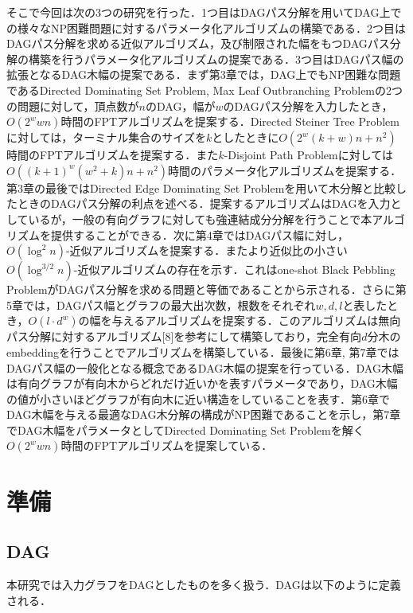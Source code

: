 \documentclass[master]{kuisthesis}		%
\theoremstyle{plain}
\theoremstyle{definition}
\begin{document}
そこで今回は次の3つの研究を行った．1つ目はDAGパス分解を用いてDAG上での様々なNP困難問題に対するパラメータ化アルゴリズムの構築である．2つ目はDAGパス分解を求める近似アルゴリズム，及び制限された幅をもつDAGパス分解の構築を行うパラメータ化アルゴリズムの提案である．3つ目はDAGパス幅の拡張となるDAG木幅の提案である．まず第3章では，DAG上でもNP困難な問題であるDirected Dominating Set Problem, Max Leaf Outbranching Problemの2つの問題に対して，頂点数が$n$のDAG，幅が$w$のDAGパス分解を入力したとき，$O(2^wwn)$時間のFPTアルゴリズムを提案する．Directed Steiner Tree Problemに対しては，ターミナル集合のサイズを$k$としたときに$O(2^w(k+w)n+n^2)$時間のFPTアルゴリズムを提案する．また$k$-Disjoint Path Problemに対しては$O((k+1)^w(w^2+k)n+n^2)$時間のパラメータ化アルゴリズムを提案する．第3章の最後ではDirected Edge Dominating Set Problemを用いて木分解と比較したときのDAGパス分解の利点を述べる．提案するアルゴリズムはDAGを入力としているが，一般の有向グラフに対しても強連結成分分解を行うことで本アルゴリズムを提供することができる．次に第4章ではDAGパス幅に対し，$O(\log^2 n)$-近似アルゴリズムを提案する．またより近似比の小さい$O(\log^{3/2} n)$-近似アルゴリズムの存在を示す．これはone-shot Black Pebbling ProblemがDAGパス分解を求める問題と等価であることから示される．さらに第5章では，DAGパス幅とグラフの最大出次数，根数をそれぞれ$w, d, l$と表したとき，$O(l\cdot d^w)$の幅を与えるアルゴリズムを提案する．このアルゴリズムは無向パス分解に対するアルゴリズム[8]を参考にして構築しており，完全有向$d$分木のembeddingを行うことでアルゴリズムを構築している．最後に第6章, 第7章ではDAGパス幅の一般化となる概念であるDAG木幅の提案を行っている．DAG木幅は有向グラフが有向木からどれだけ近いかを表すパラメータであり，DAG木幅の値が小さいほどグラフが有向木に近い構造をしていることを表す．第6章でDAG木幅を与える最適なDAG木分解の構成がNP困難であることを示し，第7章でDAG木幅をパラメータとしてDirected Dominating Set Problemを解く$O(2^wwn)$時間のFPTアルゴリズムを提案している．










\section{準備} %


\subsection{DAG} %
本研究では入力グラフをDAGとしたものを多く扱う．DAGは以下のように定義される．
\end{document}
